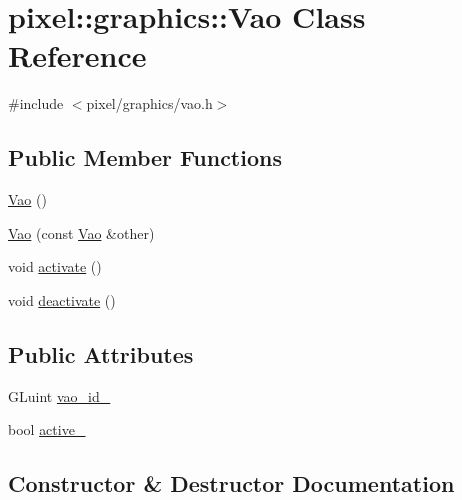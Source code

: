 \hypertarget{classpixel_1_1graphics_1_1_vao}{}\section{pixel\+:\+:graphics\+:\+:Vao Class Reference}
\label{classpixel_1_1graphics_1_1_vao}


{\ttfamily \#include $<$pixel/graphics/vao.\+h$>$}

\subsection*{Public Member Functions}
\begin{DoxyCompactItemize}
\item 
\hyperlink{classpixel_1_1graphics_1_1_vao_a8ed0e64c748fcc17f7d977369fbfd950}{Vao} ()
\item 
\hyperlink{classpixel_1_1graphics_1_1_vao_a2ab8eb23d6348faddadde0463e5ad7ce}{Vao} (const \hyperlink{classpixel_1_1graphics_1_1_vao}{Vao} \&other)
\item 
void \hyperlink{classpixel_1_1graphics_1_1_vao_a38771fdbb36558836513a8ec586677a4}{activate} ()
\item 
void \hyperlink{classpixel_1_1graphics_1_1_vao_a26bc14f02ec83523926effe32feba55d}{deactivate} ()
\end{DoxyCompactItemize}
\subsection*{Public Attributes}
\begin{DoxyCompactItemize}
\item 
G\+Luint \hyperlink{classpixel_1_1graphics_1_1_vao_a159a7fd883408fcad068f06bf563339b}{vao\+\_\+id\+\_\+}
\item 
bool \hyperlink{classpixel_1_1graphics_1_1_vao_ade88abb2c0c25f568a34d8256f7eb6ce}{active\+\_\+}
\end{DoxyCompactItemize}


\subsection{Constructor \& Destructor Documentation}
\mbox{\label{classpixel_1_1graphics_1_1_vao_a8ed0e64c748fcc17f7d977369fbfd950}} 
